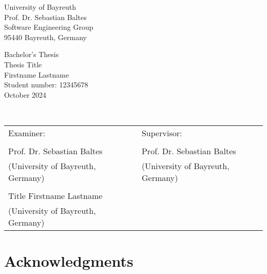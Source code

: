 \documentclass[
	pdftex,
	final,
	12pt,
	a4paper,
	parskip=false, %
	twoside, %
	footheight=0mm, %
  	foot include=false,
	toc=bibliography, %
	toc=listof, %
]{scrbook} %
\theoremstyle{definitiontight}
\newcommand{\thesistype}{Bachelor's Thesis} %
\newcommand{\thesistitle}{Thesis Title}
\newcommand{\studentname}{Firstname Lastname}
\newcommand{\monthyear}{October 2024}
\newcommand{\studentnumber}{12345678}
\newcommand{\examiner}{Prof. Dr. Sebastian Baltes}
\newcommand{\secondexaminer}{Title Firstname Lastname}
\newcommand{\supervisor}{Prof. Dr. Sebastian Baltes} %
\begin{document}
{
\thispagestyle{empty}
	
\begin{center}
	{\large University of Bayreuth}\\
	\vspace{5pt}
	Prof. Dr. Sebastian Baltes\\
	Software Engineering Group\\
	95440 Bayreuth, Germany\\
\end{center}
	
\vspace{1pt}
	
\begin{center}
	\thesistype \\
	\vspace{11pt}
	{\Large\textsf{\thesistitle}}\\
	\vspace{15pt}
	\studentname \\
	{\scriptsize Student number: \studentnumber}\\
	\vspace{15pt}
	\monthyear \\
\end{center}

\vspace{10pt}
	
\begin{center}
	{\large{}}\\
\end{center}
\noindent \lipsum[1-2]

\vfill
	
\noindent
\begin{tabularx}{\textwidth}{l X l}
   Examiner:     & & Supervisor: \\
   \\
   \examiner         & & \supervisor \\
   {\scriptsize (University of Bayreuth, Germany)} & & {\scriptsize (University of Bayreuth, Germany)} \\
   \\
   \secondexaminer && \\
   {\scriptsize (University of Bayreuth, Germany)} & & 
\end{tabularx}

\newpage

\chapter*{Acknowledgments}

}
\end{document}
